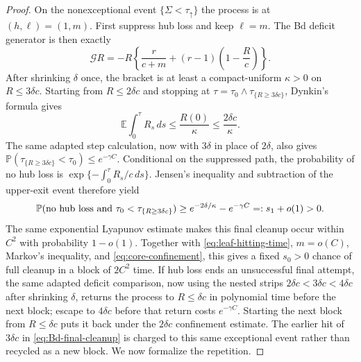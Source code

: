 \documentclass[11pt]{article}
\theoremstyle{definition}
\theoremstyle{remark}
\newcommand{\Prob}{\mathbb P}
\begin{document}
\begin{proof}
On the nonexceptional event $\{\Sigma<\tau_\uparrow\}$ the process is at
$(h,\ell)=(1,m)$.  First suppress hub loss and keep $\ell=m$.  The Bd deficit
generator is then exactly
\[
 \mathcal G R
 =-R\left\{\frac r{c+m}+(r-1)\left(1-\frac Rc\right)\right\}.
\]
After shrinking $\delta$ once, the bracket is at least a compact-uniform
$\kappa>0$ on $R\leq3\delta c$.  Starting from $R\leq2\delta c$ and stopping
at $\tau=\tau_0\wedge\tau_{\{R\geq3\delta c\}}$, Dynkin's formula gives
\[
 \mathbb E\int_0^\tau R_s\,ds\leq\frac{R(0)}\kappa
 \leq\frac{2\delta c}\kappa.
\]
The same adapted step calculation, now with $3\delta$ in place of
$2\delta$, also gives
$\Prob(\tau_{\{R\geq3\delta c\}}<\tau_0)\leq e^{-\gamma C}$.  Conditional
on the suppressed path, the probability of no hub loss is
$\exp\{-\int_0^\tau R_s/c\,ds\}$.  Jensen's inequality and subtraction of
the upper-exit event therefore yield
\begin{equation}
 \Prob(\hbox{no hub loss and }\tau_0<\tau_{\{R\geq3\delta c\}})
 \geq e^{-2\delta/\kappa}-e^{-\gamma C}=:s_1+o(1)>0.
\label{eq:Bd-final-cleanup}
\end{equation}
The same exponential Lyapunov estimate makes this final cleanup occur within
$C^2$ with probability $1-o(1)$.  Together with
\eqref{eq:leaf-hitting-time}, $m=o(C)$, Markov's inequality, and
\eqref{eq:core-confinement}, this gives a fixed $s_0>0$ chance of full cleanup
in a block of $2C^2$ time.  If hub loss ends
an unsuccessful final attempt, the same adapted deficit comparison, now
using the nested strips $2\delta c<3\delta c<4\delta c$ after shrinking
$\delta$, returns the process to $R\leq\delta c$ in polynomial time before
the next block; escape to $4\delta c$ before that return costs
$e^{-\gamma C}$.  Starting the next block from $R\leq\delta c$ puts it back
under the $2\delta c$ confinement estimate.  The earlier
hit of $3\delta c$ in \eqref{eq:Bd-final-cleanup} is charged to this same
exceptional event rather than recycled as a new block.  We now formalize the
repetition.


\end{proof}
\end{document}
